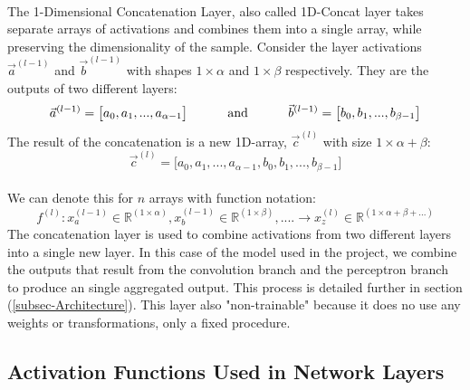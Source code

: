 \documentclass[12pt,letterpaper]{article}
\begin{document}
\paragraph*{}The 1-Dimensional Concatenation Layer, also called 1D-Concat layer takes separate arrays of activations and combines them into a single array, while preserving the dimensionality of the sample. Consider the layer activations $\vec{a}^{(l-1)}$ and $\vec{b}^{(l-1)}$ with shapes  $1 \times \alpha$ and $1 \times \beta$ respectively. They are the outputs of two different layers:
\begin{equation}
\vec{a}^{(l-1)} = \big[ a_{0},  a_{1}, ... ,  a_{\alpha-1} \big]
\text{\hspace{1cm} and \hspace{1cm}}
\vec{b}^{(l-1)} = \big[ b_{0},  b_{1}, ... ,  b_{\beta-1} \big]
\end{equation}
The result of the concatenation is a new 1D-array, $\vec{c}^{(l)}$ with size $1 \times \alpha + \beta$:
\begin{equation}
\vec{c}^{(l)} = \big[ a_{0},  a_{1}, ... ,  a_{\alpha-1}, b_{0},  b_{1}, ... ,  b_{\beta-1} \big]
\end{equation}

\paragraph*{}We can denote this for $n$ arrays with function notation:
\begin{equation}
\label{eqn-ConcatenationFunction}
f^{(l)} : x^{(l-1)}_{a} \in \mathbb{R}^{(1 \times \alpha)} , x^{(l-1)}_{b} \in \mathbb{R}^{(1 \times \beta)} , ....  \rightarrow
x^{(l)}_{z} \in \mathbb{R}^{(1 \times \alpha + \beta + ...)}
\end{equation}
The concatenation layer is used to combine activations from two different layers into a single new layer. In this case of the model used in the project, we combine the outputs that result from the convolution branch and the perceptron branch to produce an single aggregated output. This process is detailed further in section (\ref{subsec-Architecture}). This layer also "non-trainable" because it does no use any weights or transformations, only a fixed procedure.


\subsection{Activation Functions Used in Network Layers}
\label{sec-ActivationFunctions}
\end{document}
